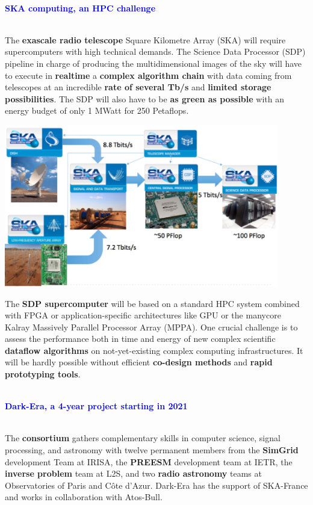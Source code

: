 \documentclass{beamer}
\renewenvironment{block}[1]{%
\begin{Sbox}%
\begin{minipage}[t]{\textwidth}
~\\
\textcolor{blue}{\quad #1}~\\
~\\%
\vspace{0.5cm}
} 
{%
\end{minipage}
\end{Sbox}\Ovalbox{\TheSbox}%
}
\begin{document}
{\vspace{1cm}
\begin{columns}[t]
\begin{column}{.49\linewidth}
\begin{block}{\large \textbf{SKA computing, an HPC challenge}}
        \begin{minipage}{0.95\textwidth}
The \textbf{exascale radio telescope} Square Kilometre Array (SKA) \cite{skatelescope} will require supercomputers with high technical demands. The Science Data Processor (SDP) pipeline in charge of producing the multidimensional images of the sky will have to execute in \textbf{realtime} a \textbf{complex algorithm chain} with data coming from telescopes at an incredible \textbf{rate of several Tb/s} and \textbf{limited storage possibilities}. The SDP will also have to be \textbf{as green as possible} with an energy budget of only 1 MWatt for 250 Petaflops. 

\begin{center}
    \includegraphics[width=0.9\textwidth ]{pipeline} %
    \end{center}

The \textbf{SDP supercomputer} will be based on a standard HPC system combined with FPGA or application-specific architectures like GPU or the manycore Kalray Massively Parallel Processor Array (MPPA). One crucial challenge is to assess the performance both in time and energy of new complex scientific \textbf{dataflow algorithms} on not-yet-existing complex computing infrastructures. It will be hardly possible without efficient \textbf{co-design methods} and \textbf{rapid prototyping tools}.
\end{minipage}
\end{block}

\begin{block}{\large \textbf{Dark-Era, a 4-year project starting in 2021}}
 \begin{minipage}{0.95\textwidth}
The \textbf{consortium} gathers complementary skills in computer science, signal processing, and astronomy with twelve permanent members from the \textbf{SimGrid} \cite{casanova:hal-01017319} development Team at IRISA, the \textbf{PREESM} \cite{preesm} development team at IETR, the \textbf{inverse problem} team at L2S, and two \textbf{radio astronomy} teams at Observatories of Paris and Côte d’Azur. Dark-Era has the support of SKA-France and works in collaboration with Atos-Bull.\\


\end{minipage}
\end{block}
\end{column}
\end{columns}}
\end{document}
